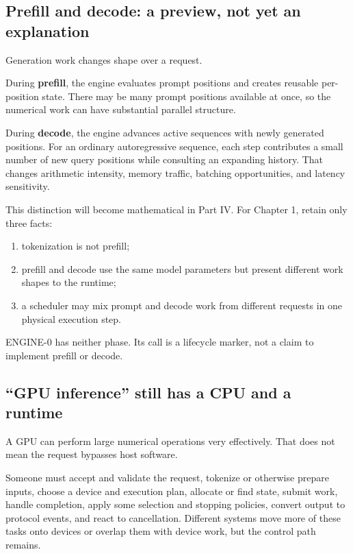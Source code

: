 \documentclass[
  10pt,
]{article}
\providecommand{\tightlist}{%
  \setlength{\itemsep}{0pt}\setlength{\parskip}{0pt}}
\begin{document}
\subsection{Prefill and decode: a preview, not yet an
explanation}\label{prefill-and-decode-a-preview-not-yet-an-explanation}

Generation work changes shape over a request.

During \textbf{prefill}, the engine evaluates prompt positions and
creates reusable per-position state. There may be many prompt positions
available at once, so the numerical work can have substantial parallel
structure.

During \textbf{decode}, the engine advances active sequences with newly
generated positions. For an ordinary autoregressive sequence, each step
contributes a small number of new query positions while consulting an
expanding history. That changes arithmetic intensity, memory traffic,
batching opportunities, and latency sensitivity.

This distinction will become mathematical in Part IV. For Chapter 1,
retain only three facts:

\begin{enumerate}
\def\labelenumi{\arabic{enumi}.}
\tightlist
\item
  tokenization is not prefill;
\item
  prefill and decode use the same model parameters but present different
  work shapes to the runtime;
\item
  a scheduler may mix prompt and decode work from different requests in
  one physical execution step.
\end{enumerate}

ENGINE-0 has neither phase. Its \texttt{}
call is a lifecycle marker, not a claim to implement prefill or decode.

\subsection{``GPU inference'' still has a CPU and a
runtime}\label{gpu-inference-still-has-a-cpu-and-a-runtime}

A GPU can perform large numerical operations very effectively. That does
not mean the request bypasses host software.

Someone must accept and validate the request, tokenize or otherwise
prepare inputs, choose a device and execution plan, allocate or find
state, submit work, handle completion, apply some selection and stopping
policies, convert output to protocol events, and react to cancellation.
Different systems move more of these tasks onto devices or overlap them
with device work, but the control path remains.
\end{document}
